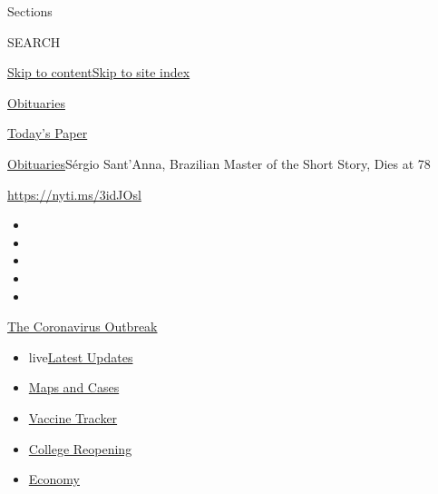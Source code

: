 Sections

SEARCH

\protect\hyperlink{site-content}{Skip to
content}\protect\hyperlink{site-index}{Skip to site index}

\href{https://www.nytimes3xbfgragh.onion/section/obituaries}{Obituaries}

\href{https://myaccount.nytimes3xbfgragh.onion/auth/login?response_type=cookie\&client_id=vi}{}

\href{https://www.nytimes3xbfgragh.onion/section/todayspaper}{Today's
Paper}

\href{/section/obituaries}{Obituaries}\textbar{}Sérgio Sant'Anna,
Brazilian Master of the Short Story, Dies at 78

\url{https://nyti.ms/3idJOsl}

\begin{itemize}
\item
\item
\item
\item
\item
\end{itemize}

\href{https://www.nytimes3xbfgragh.onion/news-event/coronavirus?action=click\&pgtype=Article\&state=default\&region=TOP_BANNER\&context=storylines_menu}{The
Coronavirus Outbreak}

\begin{itemize}
\tightlist
\item
  live\href{https://www.nytimes3xbfgragh.onion/2020/08/04/world/coronavirus-covid-19.html?action=click\&pgtype=Article\&state=default\&region=TOP_BANNER\&context=storylines_menu}{Latest
  Updates}
\item
  \href{https://www.nytimes3xbfgragh.onion/interactive/2020/us/coronavirus-us-cases.html?action=click\&pgtype=Article\&state=default\&region=TOP_BANNER\&context=storylines_menu}{Maps
  and Cases}
\item
  \href{https://www.nytimes3xbfgragh.onion/interactive/2020/science/coronavirus-vaccine-tracker.html?action=click\&pgtype=Article\&state=default\&region=TOP_BANNER\&context=storylines_menu}{Vaccine
  Tracker}
\item
  \href{https://www.nytimes3xbfgragh.onion/2020/08/02/us/covid-college-reopening.html?action=click\&pgtype=Article\&state=default\&region=TOP_BANNER\&context=storylines_menu}{College
  Reopening}
\item
  \href{https://www.nytimes3xbfgragh.onion/live/2020/08/03/business/stock-market-today-coronavirus?action=click\&pgtype=Article\&state=default\&region=TOP_BANNER\&context=storylines_menu}{Economy}
\end{itemize}

